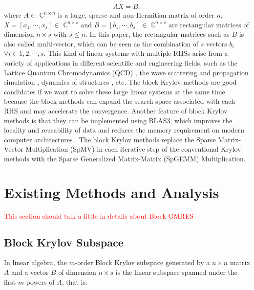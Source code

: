 \begin{equation}
\label{AX=B}
AX =  B,
\end{equation}
where $A \in$ $\mathbb{C}^{n \times n}$ is a large, sparse and non-Hermitian matrix of order $n$, $X=[x_1,\cdots,x_s] \in$  $\mathbb{C}^{n \times s}$ and $B=[b_1,\cdots,b_s] \in$  $\mathbb{C}^{n \times s}$ are rectangular matrices of dimension $n \times s$ with $s \leq n$. In this paper, the rectangular matrices such as $B$ is also called multi-vector, which can be seen as the combination of $s$ vectors $b_i$ $\forall i \in 1, 2, \cdots, s$. This kind of linear systems with multiple RHSs arise from a variety of applications in different scientific and engineering fields, such as the Lattice Quantum Chromodynamics (QCD) \cite{sakurai2010application, nakamura2012modified, fiebach1997variants}, the wave scattering and propagation simulation \cite{malhotra1997iterative}, dynamics of structures \cite{barbella2011block, ferraz2001block, nour1985short}, etc. The block Krylov methods are good candidates if we want to solve these large linear systems at the same time because the block methods can expand the search space associated with each RHS and may accelerate the convergence. Another feature of block Krylov methods is that they can be implemented using BLAS3, which improves the locality and reusability of data and reduces the memory requirement on modern computer architectures \cite{agullo2014block}. The block Krylov methods replace the Sparse Matrix-Vector Multiplication (SpMV) in each iterative step of the conventional Krylov methods with the Sparse Generalized Matrix-Matrix (SpGEMM) Multiplication.


\section{Existing Methods and Analysis}

\textcolor{red}{This section should talk a little in details about Block GMRES}

\subsection{Block Krylov Subspace}

In linear algebra, the $m$-order Block Krylov subspace \cite{gutknecht2006block} generated by a $n\times n$ matrix $A$ and a vector $B$ of dimension $n\times s$ is the linear subspace spanned under the first $m$ powers of $A$, that is:

